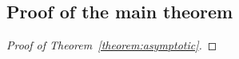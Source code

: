 \documentclass{article}
\newcommand{\E}{\mathbb{E}}
\newcommand{\I}{\mathbbm{1}}
\begin{document}
\begin{appendices}




\section{Proof of the main theorem}

\begin{proof}[Proof of Theorem~\ref{theorem:asymptotic}]
 

\end{proof}
\end{appendices}
\end{document}
